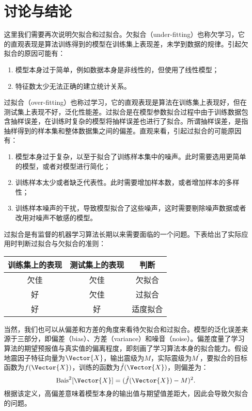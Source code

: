 \section{讨论与结论}\label{sec:seism_conclusion}

这里我们需要再次说明欠拟合和过拟合。欠拟合（under-fitting）也称欠学习，它的直观表现是算法训练得到的模型在训练集上表现差，未学到数据的规律。引起欠拟合的原因可能有：
\begin{enumerate}
    \item 模型本身过于简单，例如数据本身是非线性的，但使用了线性模型；
    \item 特征数太少无法正确的建立统计关系。
\end{enumerate}

过拟合（over-fitting）也称过学习，它的直观表现是算法在训练集上表现好，但在测试集上表现不好，泛化性能差。过拟合是在模型参数拟合过程中由于训练数据包含抽样误差，在训练时复杂的模型将抽样误差也进行了拟合。所谓抽样误差，是指抽样得到的样本集和整体数据集之间的偏差。直观来看，引起过拟合的可能原因有：
\begin{enumerate}
    \item 模型本身过于复杂，以至于拟合了训练样本集中的噪声。此时需要选用更简单的模型，或者对模型进行简化；
    \item 训练样本太少或者缺乏代表性。此时需要增加样本数，或者增加样本的多样性；
    \item 训练样本噪声的干扰，导致模型拟合了这些噪声，这时需要剔除噪声数据或者改用对噪声不敏感的模型。
\end{enumerate}

过拟合是有监督的机器学习算法长期以来需要面临的一个问题。下表给出了实际应用时判断过拟合与欠拟合的准则：
\begin{table}[!htbp]
    \label{tab:seism_overfit}
    \centering
    \footnotesize
    \begin{tabular}{ccc}
        \toprule
        训练集上的表现 & 测试集上的表现 & 判断 \\
        \midrule
        欠佳 & 欠佳 & 欠拟合 \\
        好 & 欠佳 & 过拟合 \\
        好 & 好 & 适度拟合 \\
        \bottomrule
    \end{tabular}
\end{table}

当然，我们也可以从偏差和方差的角度来看待欠拟合和过拟合。模型的泛化误差来源于三部分，即偏差（bias）、方差（variance）和噪音（noise）。偏差度量了学习算法的期望预报值与真实值的偏离程度，即刻画了学习算法本身的拟合能力。假设地震因子特征向量为$\Vector{X}$，输出震级为$M$，实际震级为$M^{\prime}$，要拟合的目标函数为$f(\Vector{X})$，训练的函数为$\hat{f}(\Vector{X})$，则偏差为：
\begin{equation}
  \mathrm{Bais}^2[\Vector{X}]=(\hat{f}(\Vector{X})-M)^2.
\end{equation}
根据该定义，高偏差意味着模型本身的输出值与期望值差距大，因此会导致欠拟合的问题。

